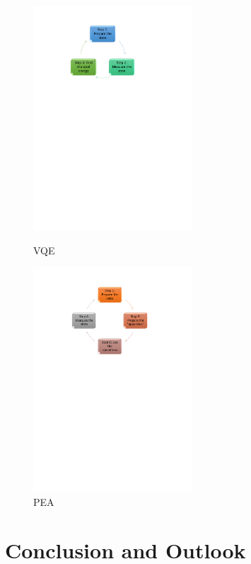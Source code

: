 \documentclass[14pt,landscape,color=UCLdarkred,margin=3cm]{uclposter}
\begin{document}
\begin{multicols}{3}
\begin{figure}[H]
  \begin{center}
  \begin{minipage}[c]{16em}
    \includegraphics[width=16em]{VQEdiagram.pdf}
    \caption{VQE}
  \end{minipage}
  \qquad
  \begin{minipage}[c]{16em}
    \includegraphics[width=16em]{PEA.pdf}
    \caption{PEA}
  \end{minipage}
  \end{center}

   
\end{figure}



\section*{Conclusion and Outlook}




\end{multicols}
\end{document}
